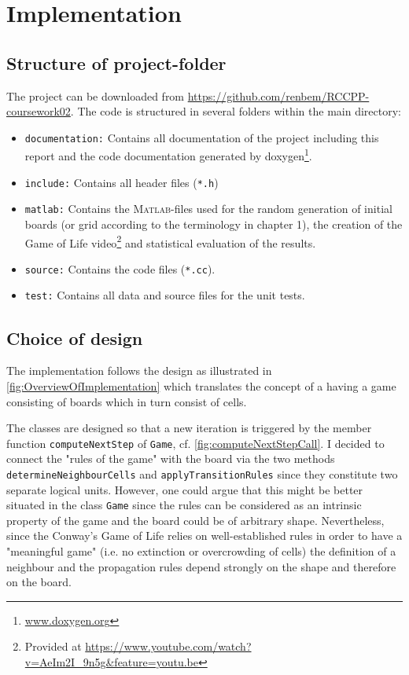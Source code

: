 \chapter{Implementation}


\section{Structure of project-folder}
The project can be downloaded from \url{https://github.com/renbem/RCCPP-coursework02}. The code is structured in several folders within the main directory:
\begin{itemize}
	\item \texttt{documentation:} Contains all documentation of the project including this report and the code documentation generated by doxygen\footnote{\url{www.doxygen.org}}.
	\item \texttt{include:} Contains all header files (\texttt{*.h})
	\item \texttt{matlab:} Contains the \textsc{Matlab}-files used for the random generation of initial boards (or grid according to the terminology in chapter 1), the creation of the Game of Life video\footnote{Provided at \url{https://www.youtube.com/watch?v=AeIm2I_9n5g&feature=youtu.be}} and statistical evaluation of the results.
	\item \texttt{source:} Contains the code files (\texttt{*.cc}).
	\item \texttt{test:}  Contains all data and source files for the unit tests.
\end{itemize}

\section{Choice of design}
The implementation follows the design as illustrated in \cref{fig:OverviewOfImplementation} which translates the concept of a having a game consisting of boards which in turn consist of cells.

The classes are designed so that a new iteration is triggered by the member function \texttt{computeNextStep} of \texttt{Game}, cf. \cref{fig:computeNextStepCall}. I decided to connect the "rules of the game" with the board via the two methods \texttt{determineNeighbourCells} and \texttt{applyTransitionRules} since they constitute two separate logical units. However, one could argue that this might be better situated in the class \texttt{Game} since the rules can be considered as an intrinsic property of the game and the board could be of arbitrary shape. Nevertheless, since the Conway's Game of Life relies on well-established rules in order to have a "meaningful game" (i.e. no extinction or overcrowding of cells) the definition of a neighbour and the propagation rules depend strongly on the shape and therefore on the board.

